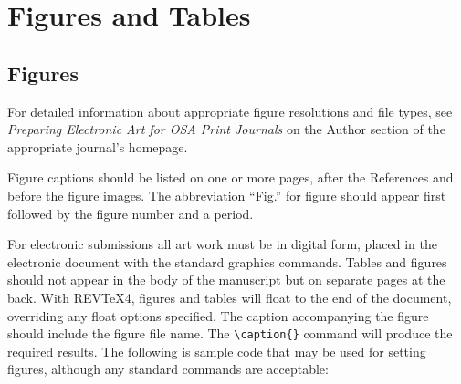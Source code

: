 \documentclass[letterpaper,12pt]{article}   %
\begin{document}



\section{Figures and Tables}

\subsection{Figures}
For detailed information about appropriate figure resolutions and
file types, see {\em Preparing Electronic Art for OSA Print
Journals} on the Author section of the appropriate journal's
homepage.

Figure captions should be listed on one or more pages, after the
References and before the figure images. The abbreviation ``Fig.''
for figure should appear first followed by the figure number and a
period.

For electronic submissions all art work must be in digital form,
placed in the electronic document with the standard graphics
commands. Tables and figures should not appear in the body of the
manuscript but on separate pages at the back. With REV\TeX{}4,
figures and tables will float to the end of the document,
overriding any float options specified.  The caption accompanying
the figure should include the figure file name. The
\verb+\caption{}+ command will produce the required results. The
following is sample code that may be used for setting figures,
although any standard commands are acceptable: 
\end{document}
